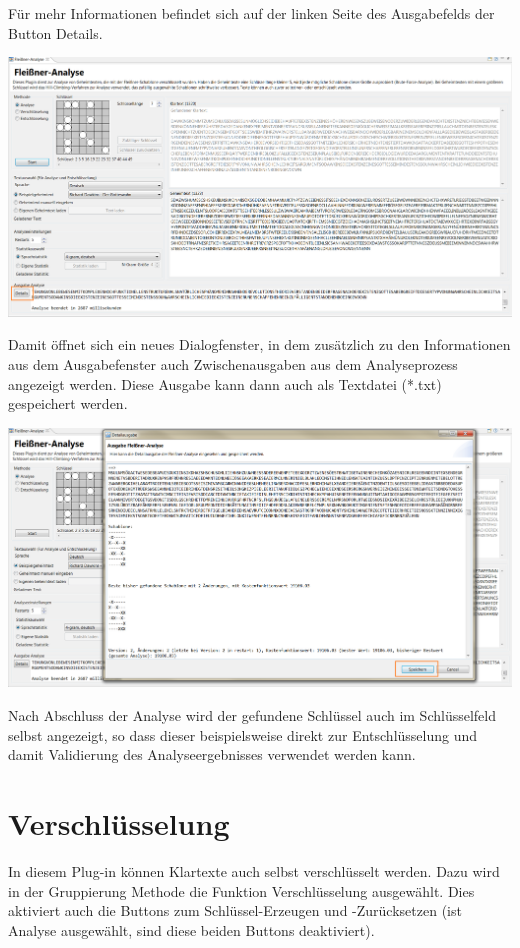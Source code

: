\documentclass[fontsize=12pt, DIV=15, parskip=half-]{scrartcl}
\theoremstyle{break}
\begin{document}
Für mehr Informationen befindet sich auf der linken Seite des Ausgabefelds der Button \glqq Details\grqq. 

\includegraphics[scale=0.45]{FleissnerAusgabeAnalyseDetailButton.png}

Damit öffnet sich ein neues Dialogfenster, in dem zusätzlich zu den Informationen aus dem Ausgabefenster auch Zwischenausgaben aus dem Analyseprozess angezeigt werden. Diese Ausgabe kann dann auch als Textdatei (*.txt) gespeichert werden.

\includegraphics[scale=0.45]{FleissnerAusgabeAnalyseGross.png}

Nach Abschluss der Analyse wird der gefundene Schlüssel auch im Schlüsselfeld selbst angezeigt, so dass dieser beispielsweise direkt zur Entschlüsselung und damit Validierung des Analyseergebnisses verwendet werden kann.
\newpage

\section{Verschlüsselung}\hypertarget{verschl}{}
In diesem Plug-in können Klartexte auch selbst verschlüsselt werden. Dazu wird in der Gruppierung
\glqq Methode\grqq{} die Funktion \glqq Verschlüsselung\grqq{} ausgewählt. Dies aktiviert auch die Buttons zum Schlüssel-Erzeugen und -Zurücksetzen (ist Analyse ausgewählt, sind diese beiden Buttons deaktiviert).
 
\end{document}
